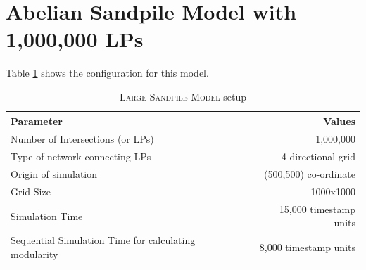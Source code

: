 \documentclass[11pt]{book}
\begin{document}
\clearpage
\section[\textsc{sandpile-1m lp}s]{Abelian Sandpile Model with 1,000,000 LPs}

Table \ref{table:sandpile_1m_config} shows the configuration for this model.

\begin{table}
    \centering
    \begin{tabular}{|| l | r ||}
        \hline
        Parameter                           &   Values\\ [0.5ex]
        \hline\hline
        Number of Intersections (or LPs)    &   1,000,000\\
        Type of network connecting LPs      &   4-directional grid\\
        Origin of simulation                &   (500,500) co-ordinate\\
        Grid Size                           &   1000x1000\\
        Simulation Time                     &   15,000 timestamp units\\
        Sequential Simulation Time for calculating modularity   &   8,000 timestamp units\\
        \hline
    \end{tabular}
    \caption{\textsc{Large Sandpile Model} setup}\label{table:sandpile_1m_config}
\end{table}
\end{document}

